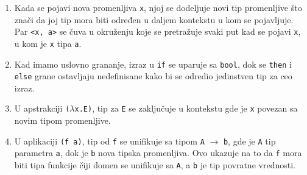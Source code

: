 \begin{enumerate}
	\item Kada se pojavi nova promenljiva \verb|x|, njoj se dodeljuje novi tip promenljive što znači da joj tip mora biti određen u daljem kontekstu u kom se pojavljuje. Par \verb|<x, a>| se čuva u okruženju koje se pretražuje svaki put kad se pojavi \verb|x|, u kom je \verb|x| tipa \verb|a|.
	
	\item Kad imamo uslovno grananje, izraz u \verb|if| se uparuje sa \verb|bool|, dok se \verb|then| i \verb|else| grane ostavljaju nedefinisane kako bi se odredio jedinstven tip za ceo izraz.
	
	\item U apstrakciji \verb|(|$\lambda$\verb|x.E)|, tip za \verb|E| se zaključuje u kontekstu gde je \verb|x| povezan sa novim tipom promenljive.
	
	\item U aplikaciji \verb|(f a)|, tip od \verb|f| se unifikuje sa tipom \verb|A| $\longrightarrow$ \verb|b|, gde je \verb|A| tip parametra \verb|a|, dok je \verb|b| nova tipska promenljiva. Ovo ukazuje na to da \verb|f| mora biti tipa funkcije čiji domen se unifikuje sa \verb|A|, a \verb|b| je tip povratne vrednosti.
\end{enumerate}
